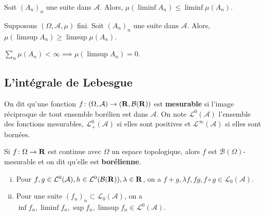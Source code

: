 	\begin{lem}
		Soit $(A_n)_n$ une suite dans $\mathcal{A}$.
		Alors, $\mu(\liminf A_n) \leq \liminf \mu(A_n)$.
	\end{lem}

	\begin{lem}
		Supposons $(\Omega,\mathcal{A},\mu)$ fini.
		Soit $(A_n)_n$ une suite dans $\mathcal{A}$.
		Alors, $\mu(\limsup A_n) \geq \limsup \mu(A_n)$.
	\end{lem}

	\begin{lem}
		$\sum_n \mu(A_n) < \infty \implies \mu(\limsup A_n) = 0$.
	\end{lem}


\subsection{L'intégrale de Lebesgue}

	\begin{defn}
		On dit qu'une fonction $f \colon (\Omega,\mathcal{A}) \to (\mathbf{R},\mathcal{B}(\mathbf{R}))$ est \textbf{mesurable} si l'image réciproque de tout ensemble borélien est dans $\mathcal{A}$.
		On note $\mathcal{L}^0(\mathcal{A})$ l'ensemble des fonctions mesurables, $\mathcal{L}^0_+(\mathcal{A})$ si elles sont positives et $\mathcal{L}^\infty(\mathcal{A})$ si elles sont bornées.
	\end{defn}
	
	\begin{rem}
		Si $f \colon \Omega \to \mathbf{R}$ est continue avec $\Omega$ un espace topologique, alors $f$ est $\mathcal{B}(\Omega)$-mesurable et on dit qu'elle est \textbf{borélienne}.
	\end{rem}
	
	\begin{pop}
		\begin{enumerate}[(i)]
			\item Pour $f,g \in \mathcal{L}^0(\mathcal{A}), h \in \mathcal{L}^0(\mathcal{B}(\mathbf{R})), \lambda \in \mathbf{R}$, on a $f + g, \lambda f, fg, f\circ g \in \mathcal{L}_0(\mathcal{A})$.
			\item Pour une suite $(f_n)_n \subset \mathcal{L}_0(\mathcal{A})$, on a $\inf f_n, \liminf f_n, \sup f_n, \limsup f_n \in \mathcal{L}^0(\mathcal{A})$.
		\end{enumerate}
	\end{pop}

